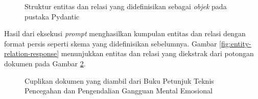 \begin{figure}[H]
	\centering
	\caption{
		Struktur entitas dan relasi yang didefinisikan sebagai \textit{objek} pada pustaka Pydantic
	}
	\label{fig:entity-relation-structure}
\end{figure}

Hasil dari eksekusi \textit{prompt} menghasilkan kumpulan entitas dan relasi dengan format persis seperti skema yang didefinisikan sebelumnya.
Gambar \ref{fig:entity-relation-response} menunjukkan entitas dan relasi yang diekstrak dari potongan dokumen pada Gambar \ref{fig:document-mini-chunk-example}.
\begin{figure}[H]
	\centering
	\caption{
		Cuplikan dokumen yang diambil dari Buku Petunjuk Teknis Pencegahan dan Pengendalian Gangguan Mental Emosional
	}
	\label{fig:document-mini-chunk-example}
\end{figure}

